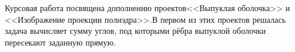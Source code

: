 Курсовая работа посвящена дополнению проектов<<Выпуклая оболочка>> и
<<Изображение проекции полиэдра>>.В первом из этих проектов решалась
задача вычисляет сумму углов, под которыми рёбра выпуклой оболочки пересекают заданную прямую. 
